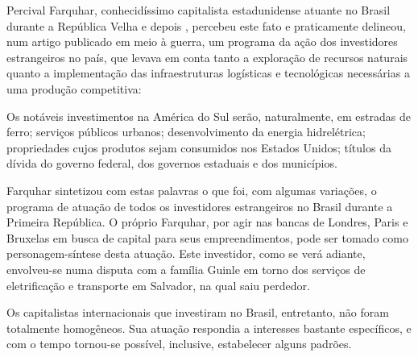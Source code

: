 Percival Farquhar, conhecidíssimo capitalista estadunidense atuante no Brasil durante a República Velha e depois \cite[pp~28, 35-41, 53-54, 60-61, 76, 83-84, 121, 150-152]{CUNHA2011}, percebeu este fato e praticamente delineou, num artigo publicado em meio à guerra, um programa da ação dos investidores estrangeiros no país, que levava em conta tanto a exploração de recursos naturais quanto a implementação das infraestruturas logísticas e tecnológicas necessárias a uma produção competitiva:

\begin{citacao}
Os notáveis investimentos na América do Sul serão, naturalmente, em estradas de ferro; serviços públicos urbanos; desenvolvimento da energia hidrelétrica; propriedades cujos produtos sejam consumidos nos Estados Unidos; títulos da dívida do governo federal, dos governos estaduais e dos municípios. \cite[p.~398]{farquhar_invest_1916}
\end{citacao}

Farquhar sintetizou com estas palavras o que foi, com algumas variações, o programa de atuação de todos os investidores estrangeiros no Brasil durante a Primeira República. O próprio Farquhar, por agir nas bancas de Londres, Paris e Bruxelas em busca de capital para seus empreendimentos, pode ser tomado como personagem-síntese desta atuação. Este investidor, como se verá adiante, envolveu-se numa disputa com a família Guinle em torno dos serviços de eletrificação e transporte em Salvador, na qual saiu perdedor.

Os capitalistas internacionais que investiram no Brasil, entretanto, não foram totalmente homogêneos. Sua atuação respondia a interesses bastante específicos, e com o tempo tornou-se possível, inclusive, estabelecer alguns padrões.

